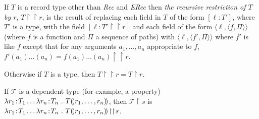 \begin{shaded}
\begin{ex}
\begin{subex}
\item {} 
 
\item {} 
 
\end{subex} 
   
\end{ex}

If $T$ is a record type other than \textit{Rec} and \textit{ERec} then
\textit{the recursive restriction of $T$ by $r$},
$T\!\restriction\restriction\!r$, is the result of replacing each
field in $T$ of the form $[\ell:T']$, where $T'$ is a type, with the
field $[\ell:T'\!\restriction\restriction\!r]$ and each field of the
form $\langle\ell,\langle f,\Pi\rangle\rangle$ (where $f$ is a
function and $\Pi$ a sequence of paths) with $\langle\ell,\langle
f',\Pi\rangle\rangle$ where $f'$ is like $f$ except that for any
arguments $a_1,\ldots,a_n$ appropriate to $f$,
$f'(a_1)\ldots(a_n)=f(a_1)\ldots(a_n)\!\restriction\restriction r$.

Otherwise if $T$ is a type, then
$T\!\restriction\restriction\!r=T\!\restriction\!r$.

If $\mathcal{T}$ is a dependent type (for example, a property)
$\lambda r_1\!:\!T_1\ldots\lambda r_n\!:\!T_n\ .\
T(\!(r_1,\ldots,r_n)\!)$, then $\mathcal{T}\!\restriction\!s$ is $\lambda r_1\!:\!T_1\ldots\lambda r_n\!:\!T_n\ .\
T\dep{r_1,\ldots,r_n}\!\restriction\restriction\!s$.

\end{shaded}


